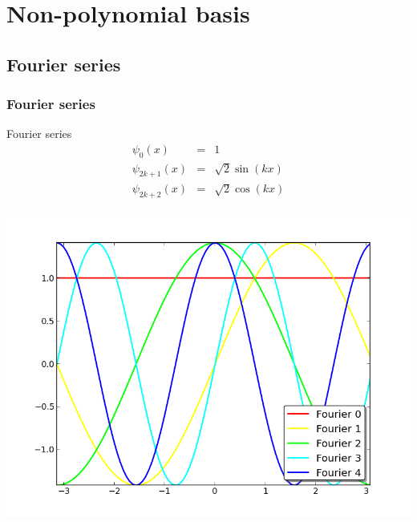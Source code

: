\documentclass{beamer}
\begin{document}
\section[Non-polynomial basis]{Non-polynomial basis}

\subsection[Fourier series]{Fourier series}
\begin{frame}
  \frametitle{Fourier series}
  \begin{block}{Fourier series}
    $$
    \begin{array}{lcl}
      \psi_0(x)      & = & 1 \\
      \psi_{2k+1}(x) & = & \sqrt{2}\sin(kx) \\
      \psi_{2k+2}(x) & = & \sqrt{2}\cos(kx)
    \end{array}
    $$
  \end{block}
  \includegraphics[scale=0.3]{figures/fourier.png}
\end{frame}
\end{document}
